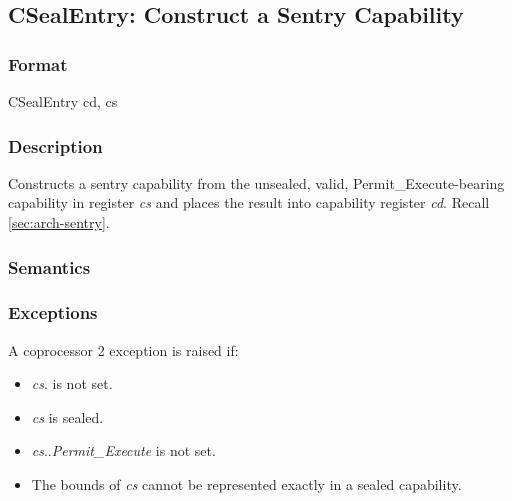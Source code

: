\clearpage
{}
{}
\subsection*{CSealEntry: Construct a Sentry Capability}

\subsubsection*{Format}

CSealEntry cd, cs

\begin{center}
\end{center}

\subsubsection*{Description}

Constructs a sentry capability from the unsealed, valid,
Permit\_Execute-bearing capability in register \emph{cs} and places the
result into capability register \emph{cd}.  Recall \cref{sec:arch-sentry}.

\subsubsection*{Semantics}

\subsubsection*{Exceptions}
A coprocessor 2 exception is raised if:

\begin{itemize}
\item
\emph{cs}.\ctag{} is not set.
\item
\emph{cs} is sealed.
\item
\emph{cs}.\cperms.\emph{Permit\_Execute} is not set.
\item
The bounds of \emph{cs} cannot be represented exactly in a sealed capability.
\end{itemize}

